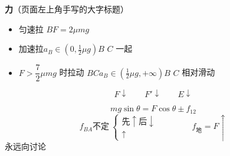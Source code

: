 \textbf{力}\quad（页面左上角手写的大字标题）
\begin{problem}
\begin{solution}
\begin{itemize}
\item 匀速拉 $B$\quad $F=2\mu mg$ %
\item 加速拉\quad $a_B\in(0,\tfrac12\mu g)$\quad $B$ $C$ 一起
\item $F>\dfrac{7}{2}\mu mg$ 时拉动 $B$$C$\quad $a_B\in(\tfrac12\mu g,+\infty)$\quad $B$ $C$ 相对滑动 %
\end{itemize}
\end{solution}
\end{problem}
\begin{problem}
\begin{solution}
\[ F\downarrow\qquad F'\downarrow\qquad E\downarrow \] %
\end{solution}
\end{problem}
\begin{problem}
\begin{solution}
\[ mg\sin\theta=F\cos\theta\pm f_{12} \]
\[ f_{BA}\text{不定}\ \begin{cases}\text{先}\uparrow\text{后}\downarrow\\ \uparrow\end{cases}\qquad\qquad f_{\text{地}}=F\uparrow \]
永远向讨论 %
\end{solution}
\end{problem}
